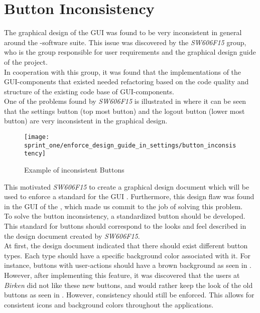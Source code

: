 \section{Button Inconsistency}
\label{sub:button_inconsistency}

The graphical design of the GUI was found to be very inconsistent in general around the \giraf-software suite. This issue was discovered by the \emph{SW606F15} group, who is the group responsible for user requirements and the graphical design guide of the project. \\

In cooperation with this group, it was found that the implementations of the GUI-components that existed needed refactoring based on the code quality and structure of the existing code base of GUI-components. \\

One of the problems found by \emph{SW606F15} is illustrated in  where it can be seen that the settings button (top most button) and the logout button (lower most button) are very inconsistent in the graphical design. \\

\begin{figure}[!htbp]
    \centering
    \texttt{[image: sprint\_one/enforce\_design\_guide\_in\_settings/button\_inconsistency]}
    \caption{Example of inconsistent Buttons}
    \label{fig:button_inconsistency}
\end{figure}

This motivated \emph{SW606F15} to create a graphical design document which will be used to enforce a standard for the GUI . Furthermore, this design flaw was found in the GUI of the \launcher, which made us commit to the job of solving this problem. \\

To solve the button inconsistency, a standardized button should be developed. This standard for buttons should correspond to the looks and feel described in the design document created by \emph{SW606F15}. \\

At first, the design document indicated that there should exist different button types. Each type should have a specific background color associated with it. For instance, buttons with user-actions should have a brown background as seen in . However, after implementing this feature, it was discovered that the users at \emph{Birken} did not like these new buttons, and would rather keep the look of the old buttons as seen in . However, consistency should still be enforced. This allows for consistent icons and background colors throughout the applications.\\

